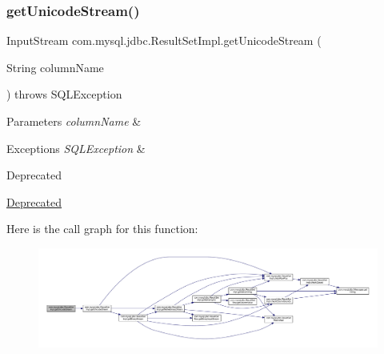 \subsubsection{\texorpdfstring{get\+Unicode\+Stream()}{getUnicodeStream()}\hspace{0.1cm}{\footnotesize\ttfamily [2/2]}}
{\footnotesize\ttfamily Input\+Stream com.\+mysql.\+jdbc.\+Result\+Set\+Impl.\+get\+Unicode\+Stream (\begin{DoxyParamCaption}\item[{String}]{column\+Name }\end{DoxyParamCaption}) throws S\+Q\+L\+Exception}


\begin{DoxyParams}{Parameters}
{\em column\+Name} & \\
\hline
\end{DoxyParams}

\begin{DoxyExceptions}{Exceptions}
{\em S\+Q\+L\+Exception} & \\
\hline
\end{DoxyExceptions}
\begin{DoxyRefDesc}{Deprecated}
\item[\mbox{\hyperlink{deprecated__deprecated000021}{Deprecated}}]\end{DoxyRefDesc}
Here is the call graph for this function\+:
\nopagebreak
\begin{figure}[H]
\begin{center}
\leavevmode
\includegraphics[width=350pt]{classcom_1_1mysql_1_1jdbc_1_1_result_set_impl_ac6f678af8cdf491781c04615014e58f5_cgraph}
\end{center}
\end{figure}
\mbox{\label{classcom_1_1mysql_1_1jdbc_1_1_result_set_impl_a7684c3389d3860adfc608fdcb8a0d40d}} 
